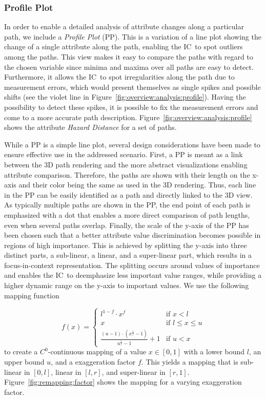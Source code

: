 \documentclass[conference,10pt,letter]{IEEEtran}
\def\IC{IC}
\begin{document}
\subsubsection{Profile Plot} \label{sec:overview:analysis:profile}
In order to enable a detailed analysis of attribute changes along a particular path, we include a \emph{Profile Plot} (PP). This is a variation of a line plot showing the change of a single attribute along the path, enabling the \IC\ to spot outliers among the paths. This view makes it easy to compare the paths with regard to the chosen variable since minima and maxima over all paths are easy to detect. Furthermore, it allows the \IC\ to spot irregularities along the path due to measurement errors, which would present themselves as single spikes and possible shifts (see the violet line in Figure~\ref{fig:overview:analysis:profile}). Having the possibility to detect these spikes, it is possible to fix the measurement errors and come to a more accurate path description. Figure~\ref{fig:overview:analysis:profile} shows the attribute \emph{Hazard Distance} for a set of paths.

While a PP is a simple line plot, several design considerations have been made to ensure effective use in the addressed scenario. First, a PP is meant as a link between the 3D path rendering and the more abstract visualizations enabling attribute comparison. Therefore, the paths are shown with their length on the x-axis and their color being the same as used in the 3D rendering. Thus, each line in the PP can be easily identified as a path and directly linked to the 3D view. As typically multiple paths are shown in the PP, the end point of each path is emphasized with a dot that enables a more direct comparison of path lengths, even when several paths overlap. Finally, the scale of the y-axis of the PP has been chosen such that a better attribute value discrimination becomes possible in regions of high importance. This is achieved by splitting the y-axis into three distinct parts, a sub-linear, a linear, and a super-linear part, which results in a focus-in-context representation. The splitting occurs around values of importance and enables the \IC\ to deemphasize less important value ranges, while providing a higher dynamic range on the y-axis to important values. We use the following mapping function

$$
f(x) = \left\{
    \begin{array}{ll}  
    l^{1-f} \cdot x^f & \textrm{if } x < l \\
    x & \textrm{if } l \leq x \leq u \\
    \frac{(u-1) \cdot \left( x^\frac{1}{f} - 1\right)}{u^\frac{1}{f} - 1} + 1 & \textrm{if } u < x
    \end{array}
    \right.
$$
to create a $C^0$-continuous mapping of a value $x \in [0,1]$ with a lower bound $l$, an upper bound $u$, and a exaggeration factor $f$. This yields a mapping that is sub-linear in $[0,l]$, linear in $[l,r]$, and super-linear in $[r,1]$. Figure~\ref{fig:remapping:factor} shows the mapping for a varying exaggeration factor.
\end{document}
